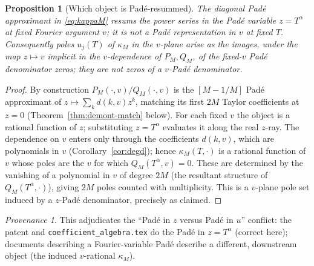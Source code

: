 \documentclass[11pt]{article}
\theoremstyle{plain}
\newtheorem{proposition}[theorem]{Proposition}
\theoremstyle{definition}
\theoremstyle{remark}
\newtheorem*{provenance}{Provenance}
\begin{document}
\begin{proposition}[Which object is Padé-resummed]\label{prop:pade-object}
The diagonal Padé approximant in \eqref{eq:kappaM} resums the power series in the
\emph{Padé variable} $z=T^\alpha$ at fixed Fourier argument $v$; it is not a Padé
representation in $v$ at fixed $T$. Consequently poles $u_j(T)$ of $\kappa_M$ in
the $v$-plane arise as the images, under the map $z\mapsto v$ implicit in the
$v$-dependence of $P_M,Q_M$, of the fixed-$v$ Padé denominator zeros; they are not
zeros of a $v$-Padé denominator.
\end{proposition}
\begin{proof}
By construction $P_M(\cdot,v)/Q_M(\cdot,v)$ is the $[M-1/M]$ Padé approximant of
$z\mapsto\sum_k d(k,v)z^k$, matching its first $2M$ Taylor coefficients at $z=0$
(Theorem~\ref{thm:demont-match} below). For each fixed $v$ the object is a
rational function of $z$; substituting $z=T^\alpha$ evaluates it along the real
$z$-ray. The dependence on $v$ enters only through the coefficients $d(k,v)$,
which are polynomials in $v$ (Corollary~\ref{cor:degd}); hence $\kappa_M(T,\cdot)$
is a rational function of $v$ whose poles are the $v$ for which
$Q_M(T^\alpha,v)=0$. These are determined by the vanishing of a polynomial in $v$
of degree $2M$ (the resultant structure of $Q_M(T^\alpha,\cdot)$), giving $2M$
poles counted with multiplicity. This is a $v$-plane pole set induced by a
$z$-Padé denominator, precisely as claimed.
\end{proof}
\begin{provenance}
This adjudicates the ``Padé in $z$ versus Padé in $u$'' conflict: the patent and
\texttt{coefficient\_algebra.tex} do the Padé in $z=T^\alpha$ (correct here);
documents describing a Fourier-variable Padé describe a different, downstream
object (the induced $v$-rational $\kappa_M$).
\end{provenance}
\end{document}
